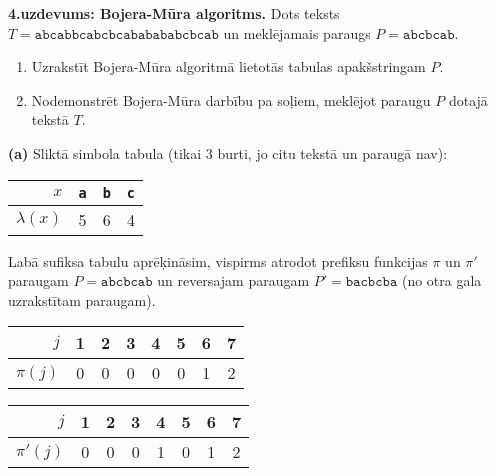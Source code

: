 \documentclass[11pt]{article}
\begin{document}
{\footnotesize
\vspace{10ex}
{\bf 4.uzdevums: Bojera-Mūra algoritms.}
Dots teksts $T = \mathtt{abcabbcabcbcababababcbcab}$ un meklējamais paraugs
$P = \mathtt{abcbcab}$.
\begin{enumerate}[label=(\alph*)]
\item Uzrakstīt Bojera-Mūra algoritmā lietotās tabulas apakšstringam $P$.
\item Nodemonstrēt Bojera-Mūra darbību pa soļiem, meklējot paraugu $P$ dotajā tekstā $T$.
\end{enumerate}
}

\vspace{2ex}
{\bf (a)} Sliktā simbola tabula (tikai $3$ burti, jo citu tekstā un paraugā nav):

\begin{tabular}{|r||c|c|c|} \hline
$x$ & {\tt a} & {\tt b} & {\tt c} \\ \hline
$\lambda(x)$ & 5 & 6 & 4 \\ \hline
\end{tabular}

Labā sufiksa tabulu aprēķināsim, vispirms atrodot prefiksu funkcijas $\pi$ 
un $\pi'$ paraugam $P = \mathtt{abcbcab}$ un reversajam paraugam 
$P' = \mathtt{bacbcba}$ (no otra gala uzrakstītam paraugam).

\begin{tabular}{|r||c|c|c|c|c|c|c|} \hline
$j$ & 1 & 2 & 3 & 4 & 5 & 6 & 7 \\ \hline
$\pi(j)$ & 0 & 0 & 0 & 0 & 0 & 1 & 2 \\ \hline
\end{tabular}

\begin{tabular}{|r||c|c|c|c|c|c|c|} \hline
$j$ & 1 & 2 & 3 & 4 & 5 & 6 & 7 \\ \hline
$\pi'(j)$ & 0 & 0 & 0 & 1 & 0 & 1 & 2 \\ \hline
\end{tabular}
\end{document}
